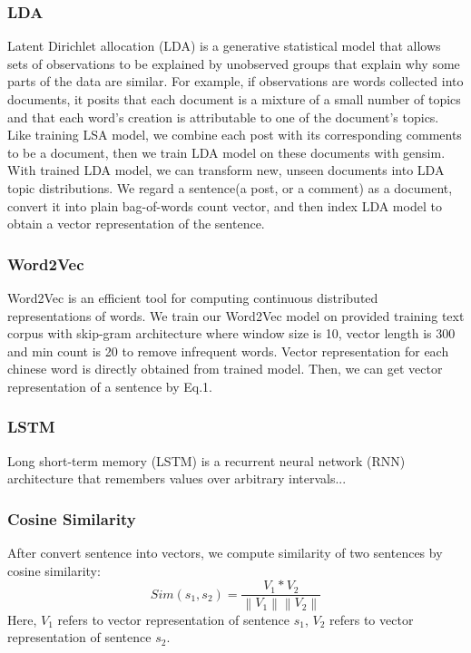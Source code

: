 \documentclass{llncs}
\begin{document}
\subsubsection{LDA}
Latent Dirichlet allocation (LDA) is a generative statistical model that allows sets of observations to be explained by unobserved groups that explain why some parts of the data are similar. For example, if observations are words collected into documents, it posits that each document is a mixture of a small number of topics and that each word's creation is attributable to one of the document's topics. Like training LSA model, we combine each post with its corresponding comments to be a document, then we train LDA model on these documents with gensim. With trained LDA model, we can transform new, unseen documents into LDA topic distributions. We regard a sentence(a post, or a comment) as a document, convert it into plain bag-of-words count vector, and then index LDA model to obtain a vector representation of the sentence. 

\subsubsection{Word2Vec}
Word2Vec is an efficient tool for computing continuous distributed 
representations of words. We train our Word2Vec model on provided training 
text corpus with skip-gram architecture where window size is 10, vector 
length is 300 and min count is 20 to remove infrequent words. Vector 
representation for each chinese word is directly obtained from trained model. 
Then, we can get vector representation of a sentence by Eq.1.

\subsubsection{LSTM}
Long short-term memory (LSTM) is a recurrent neural network (RNN) architecture that remembers values over arbitrary intervals...

\subsubsection{Cosine Similarity} 
After convert sentence into vectors, we compute similarity of two sentences by cosine similarity:
\begin{equation}
   Sim(s_1, s_2) = \frac{V_1 * V_2}{\left \| V_1 \right \| \left \| V_2 \right \|}
\end{equation}
Here, $V_1$ refers to vector representation of sentence $s_1$, $V_2$ refers to vector representation of sentence $s_2$.
\end{document}

